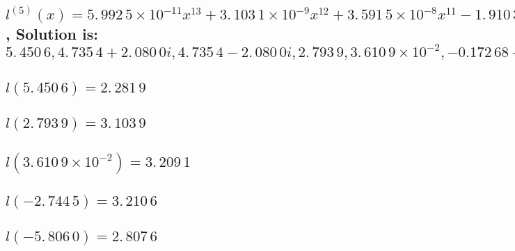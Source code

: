 \documentclass{article}
\begin{document}
\subsection{$l^{(5)}(x)=\allowbreak 5.\,\allowbreak 992\,5\times
10^{-11}x^{13}+3.\,\allowbreak 103\,1\times 10^{-9}\allowbreak
x^{12}+3.\,\allowbreak 591\,5\times 10^{-8}x^{11}-1.\,\allowbreak
910\,3\times 10^{-7}\allowbreak x^{10}-2.\,\allowbreak 539\,1\times
10^{-6}x^{9}+4.\,\allowbreak 293\,0\times 10^{-6}\allowbreak
x^{8}+6.\,\allowbreak 957\,2\times 10^{-5}x^{7}-1.\,\allowbreak 755\,6\times
10^{-5}\allowbreak x^{6}-7.\,\allowbreak 781\,7\times
10^{-4}x^{5}-7.\,\allowbreak 206\,3\times 10^{-4}x^{4}-\allowbreak
3.\,\allowbreak 549\times 10^{-3}x^{3}+5.\,\allowbreak 790\,0\times
10^{-3}x^{2}+0.049\,6\allowbreak x-1.\,\allowbreak 798\,4\times 10^{-3}=0$,
Solution is: $5.\,\allowbreak 450\,6,4.\,\allowbreak 735\,4+\allowbreak
2.\,\allowbreak 080\,0i,4.\,\allowbreak 735\,4-\allowbreak 2.\,\allowbreak
080\,0i,2.\,\allowbreak 793\,9,\allowbreak 3.\,\allowbreak 610\,9\times
10^{-2},-0.172\,68+\allowbreak 2.\,\allowbreak
723\,8i,-0.172\,68-\allowbreak 2.\,\allowbreak 723\,8i,-2.\,\allowbreak
744\,5,-\allowbreak 4.\,\allowbreak 604\,3+2.\,\allowbreak 316\,5\allowbreak
i,-4.\,\allowbreak 604\,3-2.\,\allowbreak 316\,5\allowbreak
i,-5.\,\allowbreak 806\,0,-21.\,\allowbreak 943,-\allowbreak
29.\,\allowbreak 487$}

\subsection{$l(5.\,\allowbreak 450\,6)=\allowbreak 2.\,\allowbreak 281\,9$}

\subsection{$l(2.\,\allowbreak 793\,9)=\allowbreak 3.\,\allowbreak 103\,9$}

\subsection{$l(3.\,\allowbreak 610\,9\times 10^{-2})=\allowbreak
3.\,\allowbreak 209\,1$}

\subsection{$l(-2.\,\allowbreak 744\,5)=\allowbreak 3.\,\allowbreak 210\,6$}

\subsection{$l(-5.\,\allowbreak 806\,0)=\allowbreak 2.\,\allowbreak 807\,6$}
\end{document}
